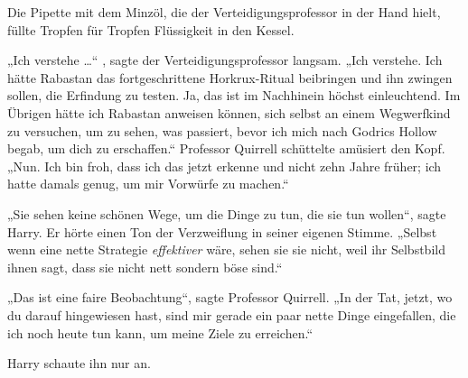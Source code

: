 Die Pipette mit dem Minzöl, die der Verteidigungsprofessor in der Hand hielt, füllte Tropfen für Tropfen Flüssigkeit in den Kessel.

„Ich verstehe …“ , sagte der Verteidigungsprofessor langsam.
„Ich verstehe. Ich hätte Rabastan das fortgeschrittene Horkrux-Ritual beibringen und ihn zwingen sollen, die Erfindung zu testen. Ja, das ist im Nachhinein höchst einleuchtend. Im Übrigen hätte ich Rabastan anweisen können, sich selbst an einem Wegwerfkind zu versuchen, um zu sehen, was passiert, bevor ich mich nach Godrics Hollow begab, um dich zu erschaffen.“
Professor Quirrell schüttelte amüsiert den Kopf.
„Nun. Ich bin froh, dass ich das jetzt erkenne und nicht zehn Jahre früher; ich hatte damals genug, um mir Vorwürfe zu machen.“

„Sie sehen keine schönen Wege, um die Dinge zu tun, die sie tun wollen“, sagte Harry.
Er hörte einen Ton der Verzweiflung in seiner eigenen Stimme.
„Selbst wenn eine nette Strategie \emph{effektiver} wäre, sehen sie sie nicht, weil ihr Selbstbild ihnen sagt, dass sie nicht nett sondern böse sind.“

„Das ist eine faire Beobachtung“, sagte Professor Quirrell.
„In der Tat, jetzt, wo du darauf hingewiesen hast, sind mir gerade ein paar nette Dinge eingefallen, die ich noch heute tun kann, um meine Ziele zu erreichen.“

Harry schaute ihn nur an.

